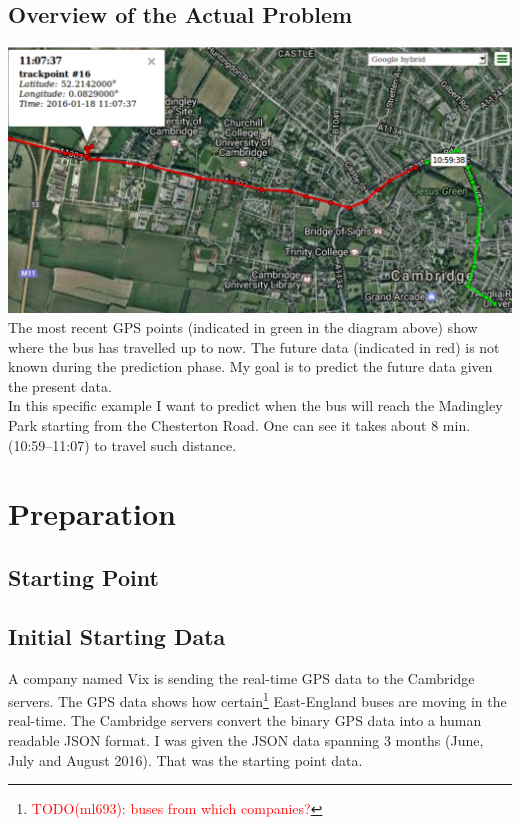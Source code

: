 \documentclass[12pt,a4paper,oneside,openright]{report}
\begin{document}
\section{Overview of the Actual Problem}

\includegraphics[width=\textwidth]{figs/problem_overview.png} \\

The most recent GPS points (indicated in green in the diagram above) show
where the bus has travelled up to now. The future data (indicated in red)
is not known during the prediction phase. My goal is to predict the future
data given the present data. \\

In this specific example I want to predict when the bus will reach the Madingley Park 
starting from the Chesterton Road. One can see it takes about 8 min. (10:59--11:07)
to travel such distance.

\chapter{Preparation}

\section{Starting Point}

\section*{Initial Starting Data}
A company named Vix is sending the real-time GPS data to the Cambridge servers. The GPS
data shows how certain\footnote{\textcolor{red}{TODO(ml693): buses from which
companies?}} East-England buses are moving in the real-time. The Cambridge servers
convert the binary GPS data into a human readable JSON format. I was given the JSON data
spanning 3 months (June, July and August 2016). That was the starting point data. \\
\end{document}
